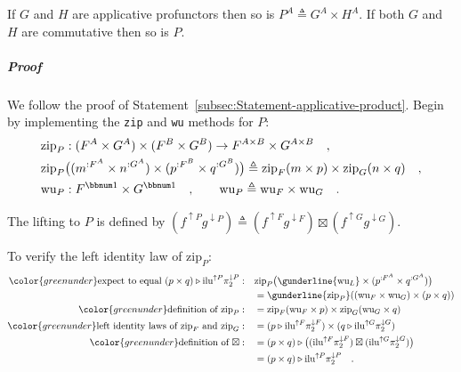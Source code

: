 If $G$ and $H$ are applicative profunctors then so is $P^{A}\triangleq G^{A}\times H^{A}$.
If both $G$ and $H$ are commutative then so is $P$.

\subparagraph{Proof}

We follow the proof of Statement~\ref{subsec:Statement-applicative-product}.
Begin by implementing the \lstinline!zip! and \lstinline!wu! methods
for $P$:
\begin{align*}
 & \text{zip}_{P}:(F^{A}\times G^{A})\times(F^{B}\times G^{B})\rightarrow F^{A\times B}\times G^{A\times B}\quad,\\
 & \text{zip}_{P}\big((m^{:F^{A}}\times n^{:G^{A}})\times(p^{:F^{B}}\times q^{:G^{B}})\big)\triangleq\text{zip}_{F}(m\times p)\times\text{zip}_{G}(n\times q)\quad,\\
 & \text{wu}_{P}:F^{\bbnum 1}\times G^{\bbnum 1}\quad,\quad\quad\text{wu}_{P}\triangleq\text{wu}_{F}\times\text{wu}_{G}\quad.
\end{align*}

The lifting to $P$ is defined by $(f^{\uparrow P}g^{\downarrow P})\triangleq(f^{\uparrow F}g^{\downarrow F})\boxtimes(f^{\uparrow G}g^{\downarrow G})$.

To verify the left identity law of $\text{zip}_{P}$:
\begin{align*}
{\color{greenunder}\text{expect to equal }(p\times q)\triangleright\text{ilu}^{\uparrow P}\pi_{2}^{\downarrow P}:}\quad & \text{zip}_{P}\big(\gunderline{\text{wu}_{L}}\times(p^{:F^{A}}\times q^{:G^{A}})\big)\\
 & =\gunderline{\text{zip}_{P}}((\text{wu}_{F}\times\text{wu}_{G})\times(p\times q))\\
{\color{greenunder}\text{definition of }\text{zip}_{P}:}\quad & =\text{zip}_{F}(\text{wu}_{F}\times p)\times\text{zip}_{G}(\text{wu}_{G}\times q)\\
{\color{greenunder}\text{left identity laws of }\text{zip}_{F}\text{ and }\text{zip}_{G}:}\quad & =(p\triangleright\text{ilu}^{\uparrow F}\pi_{2}^{\downarrow F})\times(q\triangleright\text{ilu}^{\uparrow G}\pi_{2}^{\downarrow G})\\
{\color{greenunder}\text{definition of }\boxtimes:}\quad & =(p\times q)\triangleright\big((\text{ilu}^{\uparrow F}\pi_{2}^{\downarrow F})\boxtimes(\text{ilu}^{\uparrow G}\pi_{2}^{\downarrow G})\big)\\
 & =(p\times q)\triangleright\text{ilu}^{\uparrow P}\pi_{2}^{\downarrow P}\quad.
\end{align*}

